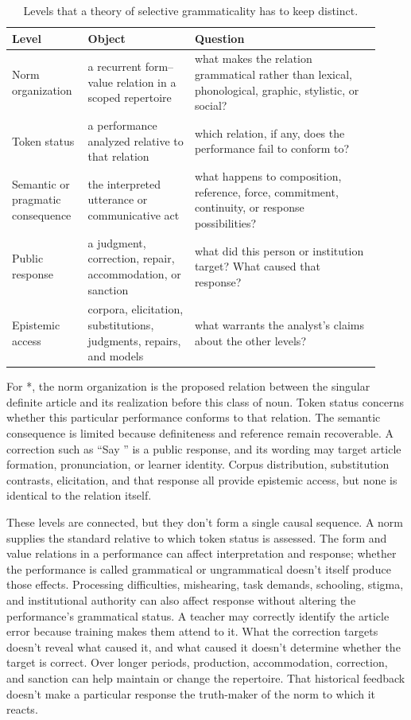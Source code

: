\documentclass[12pt,letterpaper]{article}
\begin{document}
\begin{table}[ht]
\centering
\small
\setlength{\tabcolsep}{4pt}
\begin{tabular}{@{}p{0.18\linewidth}p{0.27\linewidth}p{0.47\linewidth}@{}}
\toprule
\textbf{Level} & \textbf{Object} & \textbf{Question} \\
\midrule
Norm organization & a recurrent form--value relation in a scoped repertoire & what makes the relation grammatical rather than lexical, phonological, graphic, stylistic, or social? \\
Token status & a performance analyzed relative to that relation & which relation, if any, does the performance fail to conform to? \\
Semantic or pragmatic consequence & the interpreted utterance or communicative act & what happens to composition, reference, force, commitment, continuity, or response possibilities? \\
Public response & a judgment, correction, repair, accommodation, or sanction & what did this person or institution target? What caused that response? \\
Epistemic access & corpora, elicitation, substitutions, judgments, repairs, and models & what warrants the analyst's claims about the other levels? \\
\bottomrule
\end{tabular}
\caption{Levels that a theory of selective grammaticality has to keep distinct.}
\label{tab:levels}
\end{table}

For *, the norm organization is the proposed relation between the
singular definite article and its realization before this class of noun. Token
status concerns whether this particular performance conforms to that relation.
The semantic consequence is limited because definiteness and reference remain
recoverable. A correction such as \enquote{Say } is a public
response, and its wording may target article formation, pronunciation, or learner
identity. Corpus distribution, substitution contrasts, elicitation, and that
response all provide epistemic access, but none is identical to the relation
itself.

These levels are connected, but they don't form a single causal sequence. A norm
supplies the standard relative to which token status is assessed. The form and
value relations in a performance can affect interpretation and response; whether
the performance is called grammatical or ungrammatical doesn't itself produce
those effects. Processing difficulties, mishearing, task
demands, schooling, stigma, and institutional authority can also affect response
without altering the performance's grammatical status. A teacher may correctly
identify the article error because training makes them attend to it. What the
correction targets doesn't reveal what caused it, and what caused it doesn't
determine whether the target is correct. Over longer
periods, production, accommodation, correction, and sanction can help maintain or
change the repertoire. That historical feedback doesn't make a particular
response the truth-maker of the norm to which it reacts.
\end{document}
